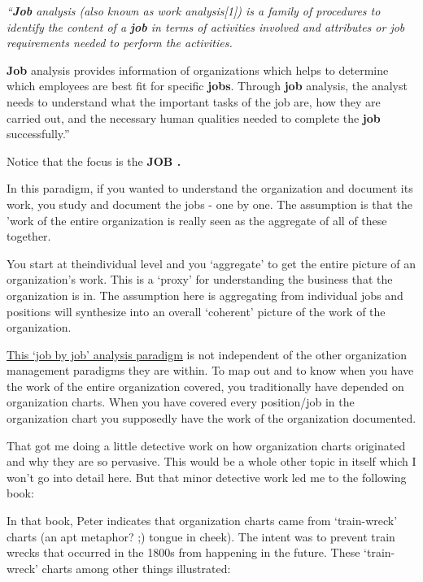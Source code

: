 \documentclass[12pt,letterpaper]{article}
\begin{document}
\emph{``\textbf{Job} analysis (also known as work analysis{[}1{]}) is a
family of procedures to identify the content of a \textbf{job} in terms
of activities involved and attributes or job requirements needed to
perform the activities.}

\textbf{Job} analysis provides information of organizations which helps
to determine which employees are best fit for specific \textbf{jobs}.
Through \textbf{job} analysis, the analyst needs to understand what the
important tasks of the job are, how they are carried out, and the
necessary human qualities needed to complete the \textbf{job}
successfully.''

Notice that the focus is the \textbf{JOB .}

In this paradigm, if you wanted to understand the organization and
document its work, you study and document the jobs - one by one.
The assumption is that the 'work of the entire organization is really
seen as the aggregate of all of these together. 

You start at theindividual level and you `aggregate' to get the 
entire picture of an organization's work. This is a `proxy' for 
understanding the business that the organization is in. The assumption here is aggregating from individual jobs and positions will synthesize
into an overall `coherent' picture of the work of the organization.

\underline{This `job by job' analysis paradigm} is not independent of the other
organization management paradigms they are within. To map out and to
know when you have the work of the entire organization covered, you
traditionally have depended on organization charts. When you have
covered every position/job in the organization chart you supposedly have
the work of the organization documented.

That got me doing a little detective work on how organization charts
originated and why they are so pervasive. This would be a whole other
topic in itself which I won't go into detail here. But that minor
detective work led me to the following book:


In that book, Peter indicates that organization charts came from
`train-wreck' charts (an apt metaphor? ;) tongue in cheek). The intent
was to prevent train wrecks that occurred in the 1800s from happening in
the future. These `train-wreck' charts among other things illustrated:
\end{document}
